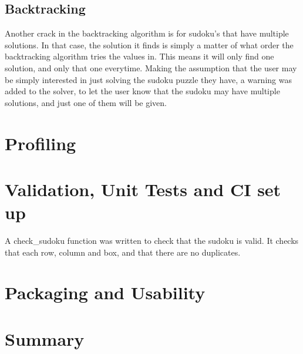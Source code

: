 \documentclass[12pt]{report} %
\begin{document}
\subsection{Backtracking}

Another crack in the backtracking algorithm is for sudoku's that have multiple solutions. In that case, the solution it finds is simply a matter of what order the backtracking algorithm tries the values in. This means it will only find one solution, and only that one everytime. Making the assumption that the user may be simply interested in just solving the sudoku puzzle they have, a warning was added to the solver, to let the user know that the sudoku may have multiple solutions, and just one of them will be given.

\section{Profiling}

\section{Validation, Unit Tests and CI set up}

A check\_sudoku function was written to check that the sudoku is valid. It checks that each row, column and box, and that there are no duplicates.

\section{Packaging and Usability}

\section{Summary}



\end{document}
